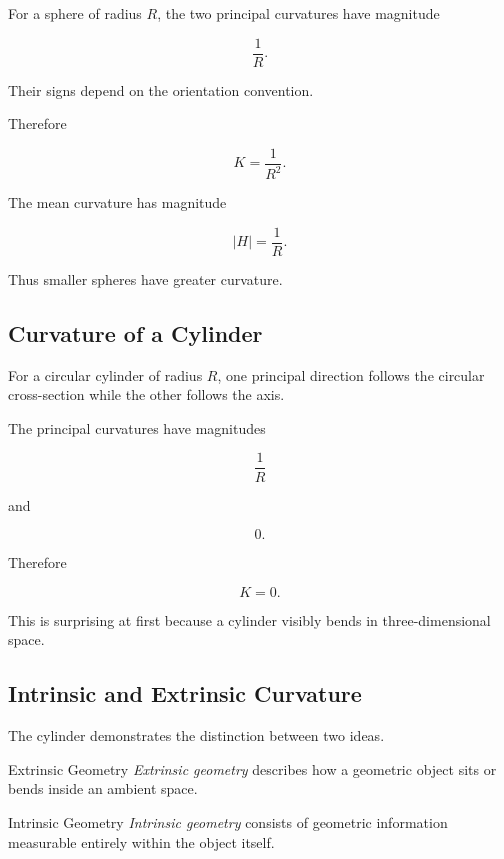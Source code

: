 For a sphere of radius \(R\), the two principal curvatures have magnitude

\[
\frac{1}{R}.
\]

Their signs depend on the orientation convention.

Therefore

\[
\boxed{
K=\frac{1}{R^2}.
}
\]

The mean curvature has magnitude

\[
\boxed{
|H|=\frac{1}{R}.
}
\]

Thus smaller spheres have greater curvature.

\subsection{Curvature of a Cylinder}
\label{subsec:curvature-cylinder}

For a circular cylinder of radius \(R\), one principal direction follows the
circular cross-section while the other follows the axis.

The principal curvatures have magnitudes

\[
\frac{1}{R}
\]

and

\[
0.
\]

Therefore

\[
\boxed{
K=0.
}
\]

This is surprising at first because a cylinder visibly bends in
three-dimensional space.

\subsection{Intrinsic and Extrinsic Curvature}
\label{subsec:intrinsic-extrinsic-curvature}

The cylinder demonstrates the distinction between two ideas.

\begin{definitionbox}{Extrinsic Geometry}
\emph{Extrinsic geometry} describes how a geometric object sits or bends
inside an ambient space.
\end{definitionbox}

\begin{definitionbox}{Intrinsic Geometry}
\emph{Intrinsic geometry} consists of geometric information measurable
entirely within the object itself.
\end{definitionbox}

